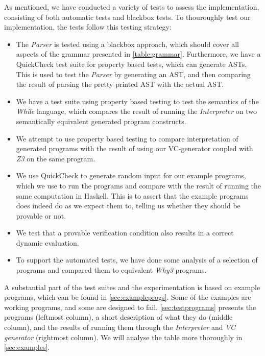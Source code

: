
As mentioned, we have conducted a variety of tests to assess the implementation, consisting of both automatic tests and blackbox tests.
To thouroughly test our implementation, the tests follow this testing strategy:
\begin{itemize}
	\item The \textit{Parser} is tested using a blackbox approach, which should cover all aspects of the grammar presented in \cref{table:grammar}.
  Furthermore, we have a QuickCheck test suite for property based tests, which can generate ASTs. This is used to test the \textit{Parser} by generating an AST, and then comparing the result of parsing the pretty printed AST with the actual AST.
	\item We have a test suite using property based testing to test the semantics of the \textit{While} language, which compares the result of running the \textit{Interpreter} on two semantically equivalent generated program constructs.
	\item We attempt to use property based testing to compare interpretation of generated programs with the result of using our VC-generator coupled with \textit{Z3} on the same program.
  \item We use QuickCheck to generate random input for our example programs, which we use to run the programs and compare with the result of running the same computation in Haskell. This is to assert that the example programs does indeed do as we expect them to, telling us whether they should be provable or not.
	\item We test that a provable verification condition also results in a correct dynamic evaluation.
  \item To support the automated tests, we have done some analysis of a selection of programs and compared them to equivalent \textit{Why3} programs.
\end{itemize}


A substantial part of the test suites and the experimentation is based on example programs, which can be found in \cref{sec:exampleprogs}.
Some of the examples are working programs, and some are designed to fail.
\cref{sec:testprograms} presents the programs (leftmost column), a short description of what they do (middle column), and the results of running them through the \textit{Interpreter} and \textit{VC generator} (rightmost column).
We will analyse the table more thoroughly in \cref{sec:examples}.

